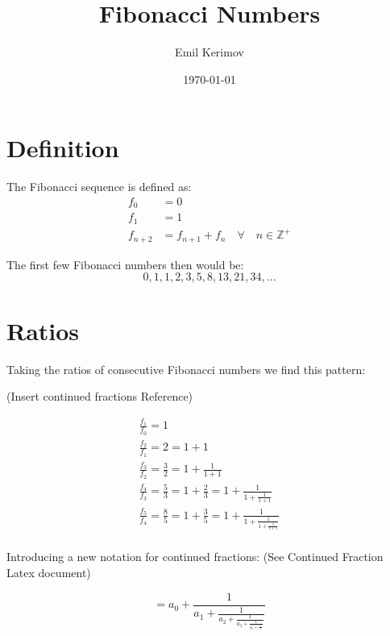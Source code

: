 \documentclass[a4paper]{article}
\title{Fibonacci Numbers}
\author{Emil Kerimov}
\date{\today}
\begin{document}
\maketitle

\newtheorem{theorem}{Theorem}[section]
\newtheorem{corollary}{Corollary}[theorem]
\newtheorem{lemma}[theorem]{Lemma}
\newtheorem{definition}{Definition}[section]

\section{Definition}

The Fibonacci sequence is defined as:
\begin{equation}
\begin{aligned}
f_0 &= 0 \\
f_1 &= 1 \\
f_{n+2} &= f_{n+1} + f_{n} \quad \forall \quad n \in \mathbb{Z}^+
\end{aligned}
\end{equation}

The first few Fibonacci numbers then would be:
$$
0,1,1,2,3,5,8,13,21, 34, ...
$$

\section{Ratios}\label{basic_ratio}

Taking the ratios of consecutive Fibonacci numbers we find this pattern:

(Insert continued fractions Reference)

\begin{gather*}
\frac{f_{1}}{f_{0}} =1 \\
\frac{f_{2}}{f_{1}} =2 = 1 + 1\\
\frac{f_{3}}{f_{2}} = \frac{3}{2} = 1 + \frac{1}{1+1}\\
\frac{f_{4}}{f_{3}} = \frac{5}{3} = 1 + \frac{2}{3}= 1 + \frac{1}{1 + \frac{1}{1 + 1}}\\
\frac{f_{5}}{f_{4}} = \frac{8}{5} = 1 + \frac{3}{5}= 1 + \frac{1}{1 + \frac{1}{1 + \frac{1}{1 + 1}}}\\
\end{gather*}

Introducing a new notation for continued fractions: (See Continued Fraction Latex document)

\begin{equation}
[a_0;a_1,a_2,a_3,a_4, ...] =  a_0 + \frac{1}{a_1 + \frac{1}{a_2 + \frac{1}{a_3 +  \frac{1}{a_4 + \frac{1}{...}}}}}
\end{equation}
\end{document}
